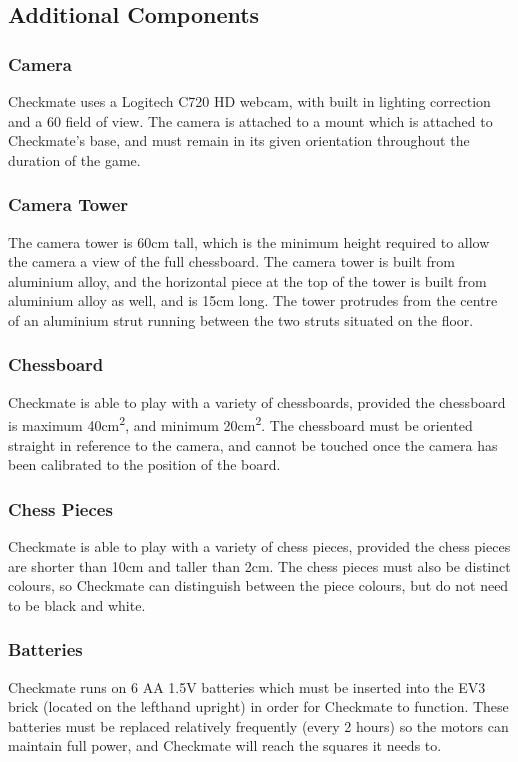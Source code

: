 \documentclass[onecolumn]{IEEEtran}
\begin{document}
\subsection{Additional Components}
\subsubsection{Camera}
Checkmate uses a Logitech C720 HD webcam, with built in lighting correction and a 60\textdegree\: field of view. The camera is attached to a mount which is attached to Checkmate's base, and must remain in its given orientation throughout the duration of the game. 
\subsubsection{Camera Tower}
The camera tower is 60cm tall, which is the minimum height required to allow the camera a view of the full chessboard. The camera tower is built from aluminium alloy, and the horizontal piece at the top of the tower is built from aluminium alloy as well, and is 15cm long. The tower protrudes from the centre of an aluminium strut running between the two struts situated on the floor. 
\subsubsection{Chessboard}
Checkmate is able to play with a variety of chessboards, provided the chessboard is maximum 40cm\textsuperscript{2}, and minimum 20cm\textsuperscript{2}. The chessboard must be oriented straight in reference to the camera, and cannot be touched once the camera has been calibrated to the position of the board. 
\subsubsection{Chess Pieces}
Checkmate is able to play with a variety of chess pieces, provided the chess pieces are shorter than 10cm and taller than 2cm. The chess pieces must also be distinct colours, so Checkmate can distinguish between the piece colours, but do not need to be black and white. 
\subsubsection{Batteries}
Checkmate runs on 6 AA 1.5V batteries which must be inserted into the EV3 brick (located on the lefthand upright) in order for Checkmate to function. These batteries must be replaced relatively frequently (\texttildelow every 2 hours) so the motors can maintain full power, and Checkmate will reach the squares it needs to. 
\end{document}
